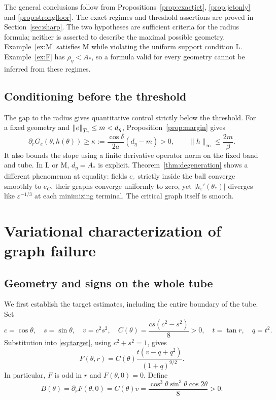 \documentclass[11pt,a4paper]{article}
\begin{document}
The general conclusions follow from Propositions~\ref{prop:exactjet},
\ref{prop:jetonly} and \ref{prop:strongfloor}. The exact regimes and
threshold assertions are proved in Section~\ref{sec:sharp}.
The two hypotheses are sufficient criteria for the radius formula;
neither is asserted to describe the maximal possible geometry.
Example~\ref{ex:M} satisfies M while violating the uniform support
condition L. Example~\ref{ex:F} has $\rho_\eta<A_*$, so a formula
valid for every geometry cannot be inferred from these regimes.


\subsection{Conditioning before the threshold}
The gap to the radius gives quantitative control strictly below
the threshold. For a fixed geometry and
$\left\lVert e\right\rVert_{T_\eta}\le m<d_\eta$, Proposition~\ref{prop:margin} gives
\[
 \partial_rG_e(\theta,h(\theta))\ge
 \kappa:=\frac{\cos\delta}{2a}(d_\eta-m)>0,
 \qquad \|h\|_\infty\le\frac{2m}{\beta}.
\]
It also bounds the slope using a finite derivative operator norm on
the fixed band and tube. In L or M, $d_\eta=A_*$ is explicit.
Theorem~\ref{thm:degeneration} shows a different phenomenon at equality:
fields $e_\varepsilon$ strictly inside the ball converge smoothly to
$e_C$, their graphs converge uniformly to zero, yet
$|h_\varepsilon'(\theta_*)|$ diverges like $\varepsilon^{-1/3}$
at each minimizing terminal. The critical graph itself is smooth.

\section{Variational characterization of graph failure}\label{sec:variational}

\subsection{Geometry and signs on the whole tube}\label{sec:signs}

We first establish the target estimates, including the entire boundary
of the tube.
Set
\[
 c=\cos\theta,\quad s=\sin\theta,\quad
 v=c^2s^2,\quad C(\theta)=\frac{cs(c^2-s^2)}8>0,\quad
 t=\tan r,\quad q=t^2.
\]
Substitution into \eqref{eq:target}, using $c^2+s^2=1$, gives
\begin{equation}\label{eq:F}
 F(\theta,r)=C(\theta)\frac{t(v-q+q^2)}{(1+q)^{9/2}}.
\end{equation}
In particular, $F$ is odd in $r$ and $F(\theta,0)=0$. Define
\begin{equation}\label{eq:B}
 B(\theta)=\partial_rF(\theta,0)
          =C(\theta)v
          =\frac{\cos^3\theta\sin^3\theta\cos2\theta}{8}>0.
\end{equation}
\end{document}
